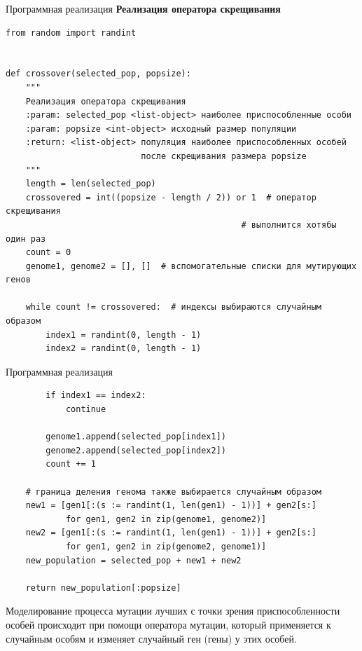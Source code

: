 \documentclass[aspectratio=169, mathserif]{beamer}	%
\begin{document}
\begin{frame}[fragile]{Программная реализация}
\scriptsize
\alert{\textbf{Реализация оператора скрещивания}}
\begin{verbatim}
from random import randint


def crossover(selected_pop, popsize):
    """
    Реализация оператора скрещивания
    :param: selected_pop <list-object> наиболее приспособленные особи
    :param: popsize <int-object> исходный размер популяции
    :return: <list-object> популяция наиболее приспособленных особей
                           после скрещивания размера popsize
    """
    length = len(selected_pop)
    crossovered = int((popsize - length / 2)) or 1  # оператор скрещивания
                                               # выполнится хотябы один раз
    count = 0
    genome1, genome2 = [], []  # вспомогательные списки для мутирующих генов

    while count != crossovered:  # индексы выбираются случайным образом
        index1 = randint(0, length - 1)
        index2 = randint(0, length - 1)
\end{verbatim}
\vfill
\end{frame}

\begin{frame}[fragile]{Программная реализация}
\scriptsize
\begin{verbatim}
        if index1 == index2:
            continue

        genome1.append(selected_pop[index1])
        genome2.append(selected_pop[index2])
        count += 1

    # граница деления генома также выбирается случайным образом
    new1 = [gen1[:(s := randint(1, len(gen1) - 1))] + gen2[s:]
            for gen1, gen2 in zip(genome1, genome2)]
    new2 = [gen1[:(s := randint(1, len(gen1) - 1))] + gen2[s:]
            for gen1, gen2 in zip(genome2, genome1)]
    new_population = selected_pop + new1 + new2

    return new_population[:popsize]
\end{verbatim}
Моделирование процесса мутации лучших с точки зрения приспособленности особей происходит при помощи оператора мутации, который применяется к случайным особям и изменяет случайный ген (гены) у этих особей.
\vfill
\end{frame}
\end{document}
